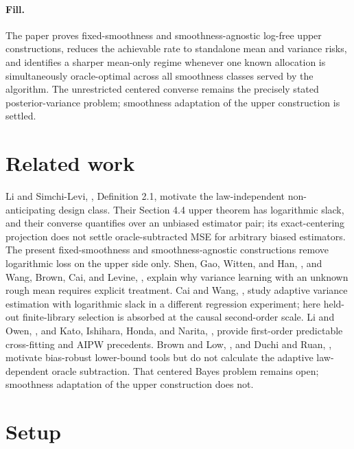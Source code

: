 \documentclass{article}
\begin{document}
\paragraph{Fill.} The paper proves fixed-smoothness and smoothness-agnostic log-free upper constructions, reduces the achievable rate to standalone mean and variance risks, and identifies a sharper mean-only regime whenever one known allocation is simultaneously oracle-optimal across all smoothness classes served by the algorithm. The unrestricted centered converse remains the precisely stated posterior-variance problem; smoothness adaptation of the upper construction is settled.

\section{Related work}

Li and Simchi-Levi, \cite{LiSimchiLevi2026SequentialEfficiency}, Definition 2.1, motivate the law-independent non-anticipating design class. Their Section 4.4 upper theorem has logarithmic slack, and their converse quantifies over an unbiased estimator pair; its exact-centering projection does not settle oracle-subtracted MSE for arbitrary biased estimators. The present fixed-smoothness and smoothness-agnostic constructions remove logarithmic loss on the upper side only. Shen, Gao, Witten, and Han, \cite{ShenGaoWittenHan2020Variance}, and Wang, Brown, Cai, and Levine, \cite{WangBrownCaiLevine2008MeanVariance}, explain why variance learning with an unknown rough mean requires explicit treatment. Cai and Wang, \cite{CaiWang2008AdaptiveVariance}, study adaptive variance estimation with logarithmic slack in a different regression experiment; here held-out finite-library selection is absorbed at the causal second-order scale. Li and Owen, \cite{LiOwen2024BatchDML}, and Kato, Ishihara, Honda, and Narita, \cite{KatoIshiharaHondaNarita2020AdaptiveATE}, provide first-order predictable cross-fitting and AIPW precedents. Brown and Low, \cite{BrownLow1996ConstrainedRisk}, and Duchi and Ruan, \cite{DuchiRuan2021ConstrainedRisk}, motivate bias-robust lower-bound tools but do not calculate the adaptive law-dependent oracle subtraction. That centered Bayes problem remains open; smoothness adaptation of the upper construction does not.

\section{Setup}
\end{document}
